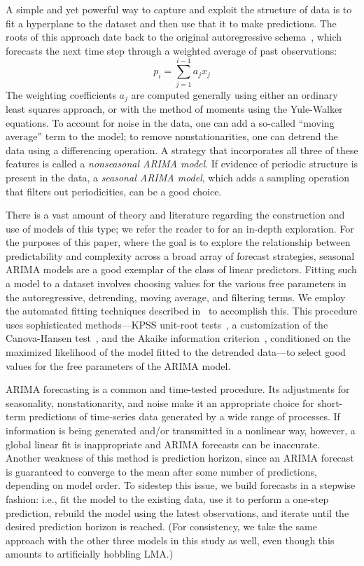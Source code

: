 A simple and yet powerful way to capture and exploit the structure of
data is to fit a hyperplane to the dataset and then use that it to
make predictions.  The roots of this approach date back to the
original autoregressive schema~\cite{weigend93}, which forecasts the
next time step through a weighted average of past observations: $$p_i
= \sum_{j=1}^{i-1} a_j x_j$$ The weighting coefficients $a_j$ are
computed generally using either an ordinary least squares approach, or with the method of moments using the Yule-Walker equations.  To account for noise in the data, one can add
a so-called ``moving average'' term to the model; to remove
nonstationarities, one can detrend the data using a differencing
operation.  A strategy that incorporates all three of these features
is called a \emph{nonseasonal ARIMA model}.  If evidence of periodic
structure is present in the data, a \emph{seasonal ARIMA model}, which
adds a sampling operation that filters out periodicities, can be a
good choice.

There is a vast amount of theory and literature regarding the
construction and use of models of this type; we refer the reader to
\cite{davislinearts} for an in-depth exploration.  For the purposes of
this paper, where the goal is to explore the relationship between
predictability and complexity across a broad array of forecast
strategies, seasonal ARIMA models are a good exemplar of the class of
linear predictors.  Fitting such a model to a dataset involves
choosing values for the various free parameters in the autoregressive,
detrending, moving average, and filtering terms.  We employ the
automated fitting techniques described in~\cite{autoARIMA} to
accomplish this.  This procedure uses sophisticated methods---KPSS
unit-root tests~\cite{KPSSunit}, a customization of the Canova-Hansen
test~\cite{Canova1995}, and the Akaike information
criterion~\cite{akaike1974}, conditioned on the maximized likelihood
of the model fitted to the detrended data---to select good values for
the free parameters of the ARIMA model.

ARIMA forecasting is a common and time-tested procedure.  Its
adjustments for seasonality, nonstationarity, and noise make it an
appropriate choice for short-term predictions of time-series data
generated by a wide range of processes.  If information is being
generated and/or transmitted in a nonlinear way, however, a global
linear fit is inappropriate and ARIMA forecasts can be inaccurate.
Another weakness of this method is prediction horizon, since an ARIMA
forecast is guaranteed to converge to the mean after some number of
predictions, depending on model order.  To sidestep this issue, we
build forecasts in a stepwise fashion: i.e., fit the model to the
existing data, use it to perform a one-step prediction, rebuild the
model using the latest observations, and iterate until the desired
prediction horizon is reached.  (For consistency, we take the same
approach with the other three models in this study as well, even
though this amounts to artificially hobbling LMA.)

